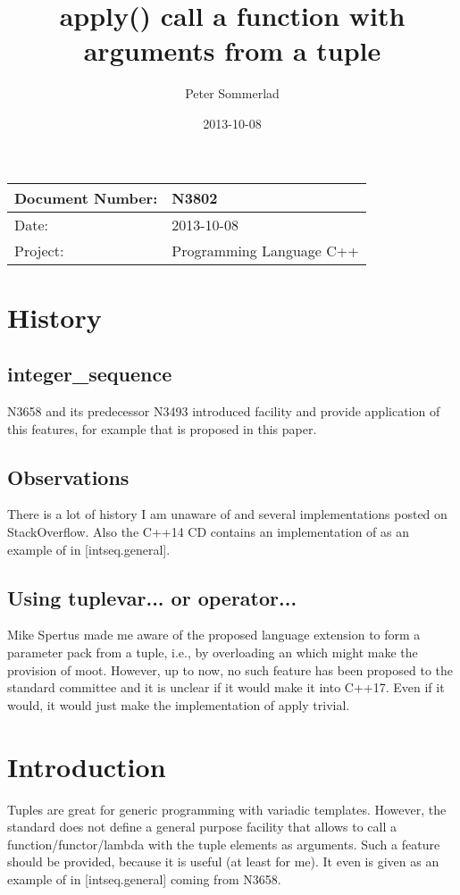 \documentclass[ebook,11pt,article]{memoir}
\title{apply() call a function with arguments from a tuple
}
\author{Peter Sommerlad}
\date{2013-10-08}                                           %
\begin{document}
\maketitle
\begin{tabular}[t]{|l|l|}\hline 
Document Number: &  N3802 \\\hline
Date: & 2013-10-08 \\\hline
Project: & Programming Language C++\\\hline 
\end{tabular}
\chapter{History}
\section{integer_sequence}
N3658 and its predecessor N3493 introduced  facility and provide application of this features, for example  that is proposed in this paper.
\section{Observations}
There is a lot of history I am unaware of and several implementations posted on StackOverflow. Also the C++14 CD contains an implementation of  as an example of  in [intseq.general].
\section{Using tuplevar... or operator...}
Mike Spertus made me aware of the proposed language extension to form a parameter pack from a tuple, i.e., by overloading an  which might make the provision of  moot. However, up to now, no such feature has been proposed to the standard committee and it is unclear if it would make it into C++17. Even if it would, it would just make the implementation of apply trivial.
\chapter{Introduction}
Tuples are great for generic programming with variadic templates. However, the standard does not define a general purpose facility that allows to call a function/functor/lambda with the tuple elements as arguments. Such a feature should be provided, because it is useful (at least for me). It even is given as an example of  in [intseq.general] coming from N3658. 
\end{document}
